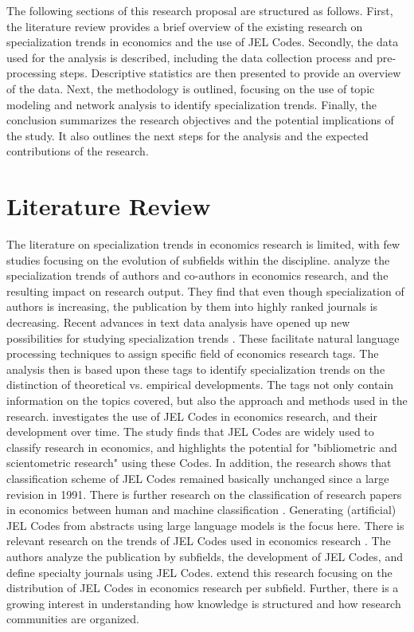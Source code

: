 \documentclass[11pt, a4paper, leqno]{article}
\begin{document}
The following sections of this research proposal are structured as follows.
First, the literature review provides a brief overview of the existing research on specialization trends in economics and the use of JEL Codes.
Secondly, the data used for the analysis is described, including the data collection process and pre-processing steps.
Descriptive statistics are then presented to provide an overview of the data.
Next, the methodology is outlined, focusing on the use of topic modeling and network analysis to identify specialization trends.
Finally, the conclusion summarizes the research objectives and the potential implications of the study.
It also outlines the next steps for the analysis and the expected contributions of the research.

\section{Literature Review}
The literature on specialization trends in economics research is limited, with few studies focusing on the evolution of subfields within the discipline.
\citet{onder2021} analyze the specialization trends of authors and co-authors in economics research, and the resulting impact on research output.
They find that even though specialization of authors is increasing, the publication by them into highly ranked journals is decreasing.
Recent advances in text data analysis have opened up new possibilities for studying specialization trends \citep{anauati2016, angrist2017, angrist2020, galiani2023a}.
These facilitate natural language processing techniques to assign specific field of economics research tags.
The analysis then is based upon these tags to identify specialization trends on the distinction of theoretical vs. empirical developments.
The tags not only contain information on the topics covered, but also the approach and methods used in the research.
\citet{heikkila2022a} investigates the use of JEL Codes in economics research, and their development over time.
The study finds that JEL Codes are widely used to classify research in economics, and highlights the potential for "bibliometric and scientometric research" using these Codes.
In addition, the research shows that classification scheme of JEL Codes remained basically unchanged since a large revision in 1991.
There is further research on the classification of research papers in economics between human and machine classification \citep{heikkila2024}.
Generating (artificial) JEL Codes from abstracts using large language models is the focus here.
There is relevant research on the trends of JEL Codes used in economics research \citep{kelly2011}.
The authors analyze the publication by subfields, the development of JEL Codes, and define specialty journals using JEL Codes.
\citet{rath2016} extend this research focusing on the distribution of JEL Codes in economics research per subfield.
Further, there is a growing interest in understanding how knowledge is structured and how research communities are organized.
\end{document}
